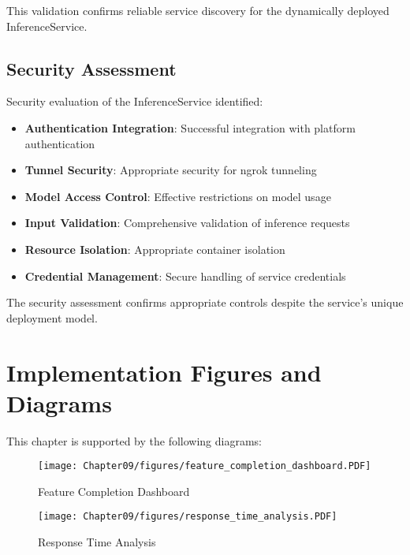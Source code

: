 This validation confirms reliable service discovery for the dynamically deployed InferenceService.

\subsection{Security Assessment}

Security evaluation of the InferenceService identified:

\begin{itemize}
    \item \textbf{Authentication Integration}: Successful integration with platform authentication
    \item \textbf{Tunnel Security}: Appropriate security for ngrok tunneling
    \item \textbf{Model Access Control}: Effective restrictions on model usage
    \item \textbf{Input Validation}: Comprehensive validation of inference requests
    \item \textbf{Resource Isolation}: Appropriate container isolation
    \item \textbf{Credential Management}: Secure handling of service credentials
\end{itemize}

The security assessment confirms appropriate controls despite the service's unique deployment model.

\section{Implementation Figures and Diagrams}

This chapter is supported by the following diagrams:


\begin{sidewaysfigure}[h]
\centering
\texttt{[image: Chapter09/figures/feature\_completion\_dashboard.PDF]}
\caption{Feature Completion Dashboard}
\label{fig:feature_completion}
\end{sidewaysfigure}

\begin{sidewaysfigure}[h]
\centering  
\texttt{[image: Chapter09/figures/response\_time\_analysis.PDF]}
\caption{Response Time Analysis}
\label{fig:response_time_analysis}
\end{sidewaysfigure}

